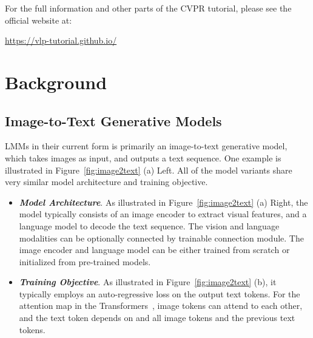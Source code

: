 \documentclass{article}
\begin{document}
For the full information and other parts of the CVPR tutorial, please see
the official website at:
\begin{center}
\vspace{-3mm}
  \url{https://vlp-tutorial.github.io/}
\end{center}



\section{Background}
\label{sec:background}



\subsection{Image-to-Text Generative Models}

LMMs in their current form is primarily an image-to-text generative model, which takes images as input, and outputs a text sequence. One example is illustrated in Figure~\ref{fig:image2text} (a) Left. All of the model variants share very similar model architecture and training objective.

\begin{itemize}[leftmargin=7.5mm]
\setlength{\itemsep}{2pt}
\item 
{\bf \it Model Architecture}. As illustrated in Figure~\ref{fig:image2text} (a) Right, the model typically consists of an image encoder to extract visual features, and a language model to decode the text sequence. The vision and language modalities can be optionally connected by trainable connection module. The image encoder and language model can be either trained from scratch or initialized from pre-trained models.

\item
{\bf \it Training Objective}. As illustrated in Figure~\ref{fig:image2text} (b), it typically employs an auto-regressive loss on the output text tokens.
For the attention map in the Transformers~\cite{vaswani2017attention},  image tokens can attend to each other, and the text token depends on and all image tokens and the previous text tokens.
\end{itemize}
\end{document}
